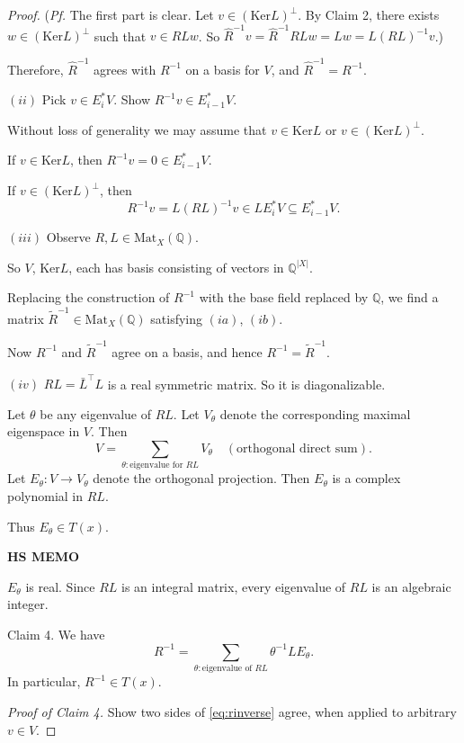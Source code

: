 \documentclass[
]{book}
\theoremstyle{definition}
\theoremstyle{definition}
\theoremstyle{definition}
\theoremstyle{definition}
\theoremstyle{remark}
\begin{document}
\begin{proof}
(\emph{Pf.} The first part is clear. Let \(v\in (\mathrm{Ker}L)^\bot\). By Claim 2, there exists \(w\in (\mathrm{Ker}L)^\bot\) such that \(v\in RLw\). So \(\hat{R}^{-1}v = \hat{R}^{-1}RLw = Lw = L(RL)^{-1}v\).)

Therefore, \(\hat{R}^{-1}\) agrees with \(R^{-1}\) on a basis for \(V\), and \(\hat{R}^{-1} = R^{-1}\).

\((ii)\) Pick \(v\in E^*_iV\). Show \(R^{-1}v\in E^*_{i-1}V\).

Without loss of generality we may assume that \(v\in \mathrm{Ker}L\) or \(v\in (\mathrm{Ker}L)^\bot\).

If \(v\in \mathrm{Ker}L\), then \(R^{-1}v = 0\in E^*_{i-1}V\).

If \(v\in (\mathrm{Ker}L)^\bot\), then
\[R^{-1}v = L(RL)^{-1}v \in LE^*_iV \subseteq E^*_{i-1}V.\]

\((iii)\) Observe \(R, L\in \mathrm{Mat}_X(\mathbb{Q})\).

So \(V\), \(\mathrm{Ker}L\), each has basis consisting of vectors in \(\mathbb{Q}^{|X|}\).

Replacing the construction of \(R^{-1}\) with the base field replaced by \(\mathbb{Q}\), we find a matrix \(\tilde{R}^{-1}\in \mathrm{Mat}_X(\mathbb{Q})\) satisfying \((ia)\), \((ib)\).

Now \(R^{-1}\) and \(\tilde{R}^{-1}\) agree on a basis, and hence \(R^{-1} = \tilde{R}^{-1}\).

\((iv)\) \(RL = \bar{L}^\top L\) is a real symmetric matrix. So it is diagonalizable.

Let \(\theta\) be any eigenvalue of \(RL\). Let \(V_\theta\) denote the corresponding maximal eigenspace in \(V\).
Then
\[V = \sum_{\theta:\text{eigenvalue for }RL}V_\theta \quad (\text{orthogonal direct sum}).\]
Let \(E_\theta: V\to V_\theta\) denote the orthogonal projection. Then \(E_\theta\) is a complex polynomial in \(RL\).

Thus \(E_\theta\in T(x)\).

\textbf{HS MEMO}

\(E_\theta\) is real. Since \(RL\) is an integral matrix, every eigenvalue of \(RL\) is an algebraic integer.

Claim 4. We have
\begin{equation}
R^{-1} = \sum_{\theta: \text{eigenvalue of }RL}\theta^{-1}LE_\theta. \label{eq:rinverse}
\end{equation}
In particular, \(R^{-1}\in T(x)\).

\emph{Proof of Claim 4.}
Show two sides of \eqref{eq:rinverse} agree, when applied to arbitrary \(v\in V\).


\end{proof}
\end{document}
